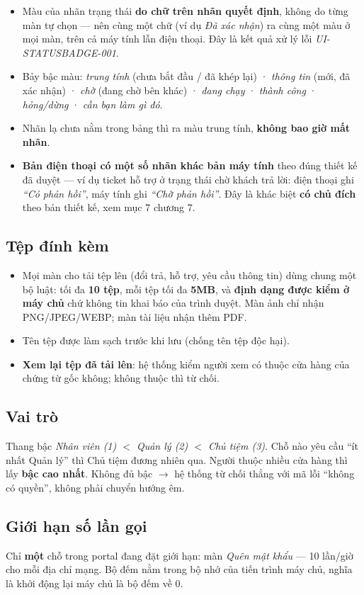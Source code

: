\begin{itemize}[leftmargin=*]
  \item Màu của nhãn trạng thái \textbf{do chữ trên nhãn quyết định}, không do từng màn tự
        chọn --- nên cùng một chữ (ví dụ \emph{Đã xác nhận}) ra cùng một màu ở mọi màn, trên cả
        máy tính lẫn điện thoại. Đây là kết quả xử lý lỗi \emph{UI-STATUSBADGE-001}.
  \item Bảy bậc màu: \emph{trung tính} (chưa bắt đầu / đã khép lại) · \emph{thông tin} (mới, đã
        xác nhận) · \emph{chờ} (đang chờ bên khác) · \emph{đang chạy} · \emph{thành công} ·
        \emph{hỏng/dừng} · \emph{cần bạn làm gì đó}.
  \item Nhãn lạ chưa nằm trong bảng thì ra màu trung tính, \textbf{không bao giờ mất nhãn}.
  \item \textbf{Bản điện thoại có một số nhãn khác bản máy tính} theo đúng thiết kế đã duyệt ---
        ví dụ ticket hỗ trợ ở trạng thái chờ khách trả lời: điện thoại ghi \emph{``Có phản
        hồi''}, máy tính ghi \emph{``Chờ phản hồi''}. Đây là khác biệt \textbf{có chủ đích}
        theo bản thiết kế, xem mục 7 chương 7.
\end{itemize}

\subsection*{Tệp đính kèm}

\begin{itemize}[leftmargin=*]
  \item Mọi màn cho tải tệp lên (đổi trả, hỗ trợ, yêu cầu thông tin) dùng chung một bộ luật:
        tối đa \textbf{10 tệp}, mỗi tệp tối đa \textbf{5MB}, và \textbf{định dạng được kiểm ở
        máy chủ} chứ không tin khai báo của trình duyệt. Màn ảnh chỉ nhận PNG/JPEG/WEBP; màn tài
        liệu nhận thêm PDF.
  \item Tên tệp được làm sạch trước khi lưu (chống tên tệp độc hại).
  \item \textbf{Xem lại tệp đã tải lên}: hệ thống kiểm người xem có thuộc cửa hàng của chứng từ
        gốc không; không thuộc thì từ chối.
\end{itemize}

\subsection*{Vai trò}

Thang bậc \emph{Nhân viên (1) $<$ Quản lý (2) $<$ Chủ tiệm (3)}. Chỗ nào yêu cầu ``ít nhất
Quản lý'' thì Chủ tiệm đương nhiên qua. Người thuộc nhiều cửa hàng thì lấy \textbf{bậc cao
nhất}. Không đủ bậc $\rightarrow$ hệ thống từ chối thẳng với mã lỗi ``không có quyền'', không
phải chuyển hướng êm.

\subsection*{Giới hạn số lần gọi}

Chỉ \textbf{một} chỗ trong portal đang đặt giới hạn: màn \emph{Quên mật khẩu} --- 10 lần/giờ cho
mỗi địa chỉ mạng. Bộ đếm nằm trong bộ nhớ của tiến trình máy chủ, nghĩa là khởi động lại máy chủ
là bộ đếm về 0.
